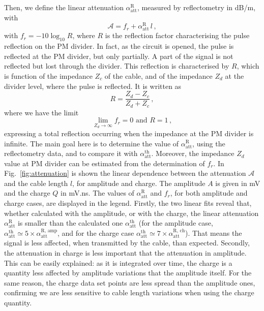 Then, we define the linear attenuation $\alpha_{\text{att}}^{\text{R}}$, measured by reflectometry in dB/m, with
\begin{equation}
  \mathcal{A} = f_{r}+\alpha_{\text{att}}^{\text{R}}\,l\,,
\end{equation}
with $f_{r} = -10\log_{10}R$, where $R$ is the reflection factor characterising the pulse reflection on the PM divider.
In fact, as the circuit is opened, the pulse is reflected at the PM divider, but only partially.
A part of the signal is not reflected but lost through the divider.
This reflection is characterised by $R$, which is function of the impedance $Z_{c}$ of the cable, and of the impedance $Z_{d}$ at the divider level, where the pulse is reflected.
It is written as
\begin{equation}
  R = \frac{Z_{d}-Z_{c}}{Z_{d}+Z_{c}}\,,
\end{equation}
where we have the limit
\begin{equation}
  \lim_{Z_{d} \to \infty} f_{r} = 0 \text{ and } R=1\,,
\end{equation}
expressing a total reflection occurring when the impedance at the PM divider is infinite.
The main goal here is to determine the value of $\alpha_{\text{att}}^{\text{R}}$, using the reflectometry data, and to compare it with $\alpha_{\text{att}}^{\text{th}}$.
Moreover, the impedance $Z_{d}$ value at PM divider can be estimated from the determination of $f_{r}$.
In Fig.~\ref{fig:attenuation} is shown the linear dependence between the attenuation $\mathcal{A}$ and the cable length $l$, for amplitude and charge.
The amplitude $A$ is given in mV and the charge $Q$ in mV.ns.
The values of $\alpha_{\text{att}}^{\text{R}}$ and $f_{r}$, for both amplitude and charge cases, are displayed in the legend.
Firstly, the two linear fits reveal that, whether calculated with the amplitude, or with the charge, the linear attenuation $\alpha_{\text{att}}^{\text{R}}$ is smaller than the calculated one $\alpha_{\text{att}}^{\text{th}}$ (for the amplitude case, $\alpha_{\text{att}}^{\text{th}}\simeq 5\times \alpha_{\text{att}}^{\text{R, amp}}$, and for the charge case $\alpha_{\text{att}}^{\text{th}}\simeq 7\times \alpha_{\text{att}}^{\text{R, ch}}$).
That means the signal is less affected, when transmitted by the cable, than expected.
Secondly, the attenuation in charge is less important that the attenuation in amplitude.
This can be easily explained: as it is integrated over time, the charge is a quantity less affected by amplitude variations that the amplitude itself.
For the same reason, the charge data set points are less spread than the amplitude ones, confirming we are less sensitive to cable length variations when using the charge quantity.
